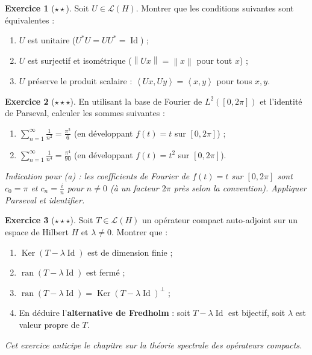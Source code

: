 \documentclass[a4paper,12pt]{book}
\DeclareMathOperator{\Id}{Id}
\DeclareMathOperator{\Ker}{Ker}
\DeclareMathOperator{\ran}{ran}
\newcommand{\norm}[1]{\left\| #1 \right\|}
\newcommand{\inner}[2]{\left\langle #1, #2 \right\rangle}
\theoremstyle{definition}
\newtheorem{exercice}{Exercice}[chapter]
\theoremstyle{plain}
\theoremstyle{remark}
\begin{document}
\begin{exercice}[$\star\star$]\label{exo:ch2-unitaire}
Soit $U \in \mathcal{L}(H)$. Montrer que les conditions suivantes sont équivalentes :
\begin{enumerate}[label=(\roman*)]
    \item $U$ est unitaire ($U^*U = UU^* = \Id$) ;
    \item $U$ est surjectif et isométrique ($\norm{Ux} = \norm{x}$ pour tout $x$) ;
    \item $U$ préserve le produit scalaire : $\inner{Ux}{Uy} = \inner{x}{y}$ pour tous $x, y$.
\end{enumerate}
\end{exercice}

\begin{exercice}[$\star\star\star$]\label{exo:ch2-parseval-explicite}
En utilisant la base de Fourier de $L^2([0,2\pi])$ et l'identité de Parseval, calculer les sommes suivantes :
\begin{enumerate}[label=(\alph*)]
    \item $\sum_{n=1}^\infty \frac{1}{n^2} = \frac{\pi^2}{6}$ \quad (en développant $f(t) = t$ sur $[0, 2\pi]$) ;
    \item $\sum_{n=1}^\infty \frac{1}{n^4} = \frac{\pi^4}{90}$ \quad (en développant $f(t) = t^2$ sur $[0, 2\pi]$).
\end{enumerate}
\textit{Indication pour (a) : les coefficients de Fourier de $f(t) = t$ sur $[0,2\pi]$ sont $c_0 = \pi$ et $c_n = \frac{i}{n}$ pour $n \neq 0$ (à un facteur $2\pi$ près selon la convention). Appliquer Parseval et identifier.}
\end{exercice}

\begin{exercice}[$\star\star\star$]\label{exo:ch2-alternative-fredholm}
Soit $T \in \mathcal{L}(H)$ un opérateur compact auto-adjoint sur un espace de Hilbert $H$ et $\lambda \neq 0$. Montrer que :
\begin{enumerate}[label=(\alph*)]
    \item $\Ker(T - \lambda\Id)$ est de dimension finie ;
    \item $\ran(T - \lambda\Id)$ est fermé ;
    \item $\ran(T - \lambda\Id) = \Ker(T - \lambda\Id)^\perp$ ;
    \item En déduire l'\textbf{alternative de Fredholm} : soit $T - \lambda\Id$ est bijectif, soit $\lambda$ est valeur propre de $T$.
\end{enumerate}
\textit{Cet exercice anticipe le chapitre sur la théorie spectrale des opérateurs compacts.}
\end{exercice}
\end{document}
